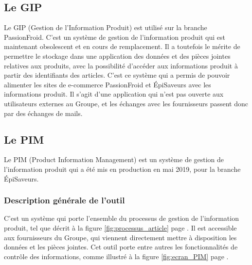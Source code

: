             \subsection{Le GIP}

            Le GIP (Gestion de l'Information Produit) est utilisé sur la branche PassionFroid.
            C'est un système de gestion de l'information produit qui est maintenant obsolescent et en cours de remplacement.
            Il a toutefois le mérite de permettre le stockage dans une application des données et des pièces jointes relatives aux produits, avec la possibilité d'accéder aux informations produit à partir des identifiants des articles.
            C'est ce système qui a permis de pouvoir alimenter les sites de e-commerce PassionFroid et \'{E}piSaveurs avec les informations produit.
            Il s'agit d'une application qui n'est pas ouverte aux utilisateurs externes au Groupe, et les échanges avec les fournisseurs passent donc par des échanges de mails.

            \subsection{Le PIM}

            Le PIM (Product Information Management) est un système de gestion de l'information produit qui a été mis en production en mai 2019, pour la branche \'{E}piSaveurs.

                \subsubsection{Description générale de l'outil}

                C'est un système qui porte l'ensemble du processus de gestion de l'information produit, tel que décrit à la figure \ref{fig:processus_article} page \pageref{fig:processus_article}.
                Il est accessible aux fournisseurs du Groupe, qui viennent directement mettre à disposition les données et les pièces jointes.
                Cet outil porte entre autres les fonctionnalités de contrôle des informations, comme illustré à la figure \ref{fig:ecran_PIM} page \pageref{fig:ecran_PIM}.


